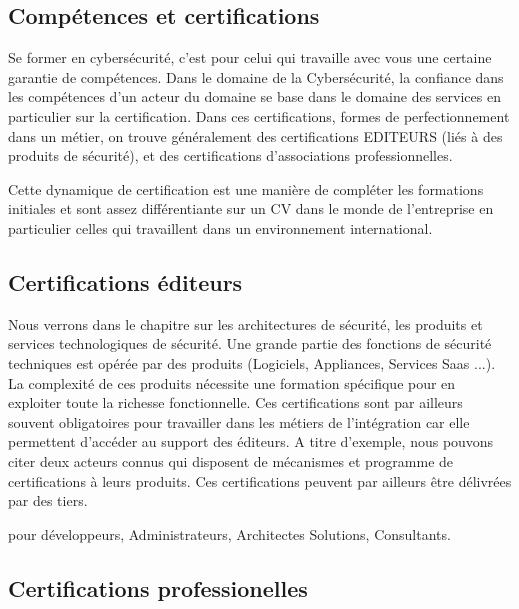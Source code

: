 \subsection{Compétences et certifications}

Se former en cybersécurité, c'est pour celui qui travaille avec vous une certaine garantie de compétences. Dans le domaine de la Cybersécurité, la confiance dans les compétences d'un acteur du domaine se base dans le domaine des services en particulier sur la certification. Dans ces certifications, formes de perfectionnement dans un métier, on trouve généralement des  certifications EDITEURS (liés à des produits de sécurité), et des certifications d'associations professionnelles.

Cette dynamique de certification est une manière de compléter les formations initiales et sont  assez différentiante sur un CV dans le monde de l'entreprise en particulier celles qui travaillent dans un environnement international.



\subsection{Certifications éditeurs}

Nous verrons dans le chapitre sur les architectures de sécurité, les produits et services technologiques de sécurité. Une grande partie des fonctions de sécurité techniques est opérée par des produits (Logiciels, Appliances, Services Saas ...). La complexité de ces produits nécessite une formation spécifique pour en exploiter toute la richesse fonctionnelle.
Ces certifications sont par ailleurs souvent obligatoires pour travailler dans les métiers de l'intégration car elle permettent d'accéder au support des éditeurs. A titre d'exemple, nous pouvons citer deux acteurs connus qui disposent de mécanismes et programme de certifications à leurs produits. Ces certifications peuvent par ailleurs être délivrées par des tiers.


  


   pour  développeurs, Administrateurs, Architectes Solutions, Consultants.

\subsection{Certifications professionelles} 

